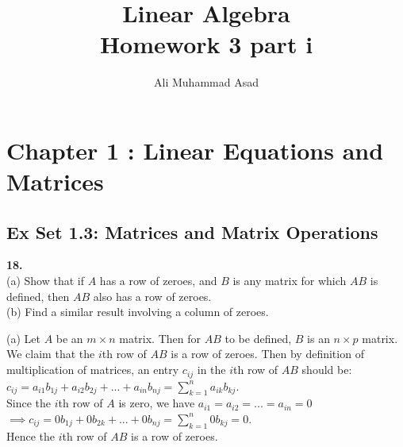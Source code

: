 \documentclass[addpoints]{exam}
\title{Linear Algebra\\ Homework 3 part i}
\author{Ali Muhammad Asad}
\begin{document}
\maketitle
\begin{sloppypar}
\section*{\textbf{Chapter 1 : Linear Equations and Matrices}}
\subsection*{\textbf{Ex Set 1.3: Matrices and Matrix Operations}}
\begin{questions}
    \question
    \textbf{18. } \\ 
    (a) Show that if $A$ has a row of zeroes, and $B$ is any matrix for which $AB$ is defined, then $AB$ also has a row of zeroes. \\ 
    (b) Find a similar result involving a column of zeroes.
    \begin{solution}
        
        (a) Let $A$ be an $ m \times n $ matrix. Then for $AB$ to be defined, $B$ is an $ n \times p $ matrix. \\ 
        We claim that the $ i $th row of $AB$ is a row of zeroes. Then by definition of multiplication of matrices, an entry $ c_{ij} $ in the $ i $th row of $AB$ should be: \\ 
        $ c_{ij} = a_{i1}b_{1j} + a_{i2}b_{2j} + ... + a_{in}b_{nj} = \displaystyle\sum_{k = 1}^{n} a_{ik}b_{kj} $. \\ 
        Since the $i$th row of $A$ is zero, we have $ a_{i1} = a_{i2} = ... = a_{in} = 0 $ \\ 
        $ \implies c_{ij} = 0b_{1j} + 0b_{2k} + ... + 0b_{nj} = \displaystyle\sum_{k = 1}^{n} 0b_{kj} = 0$. \\ 
        Hence the $ i $th row of $AB$ is a row of zeroes.


\end{solution}
\end{questions}
\end{sloppypar}
\end{document}
